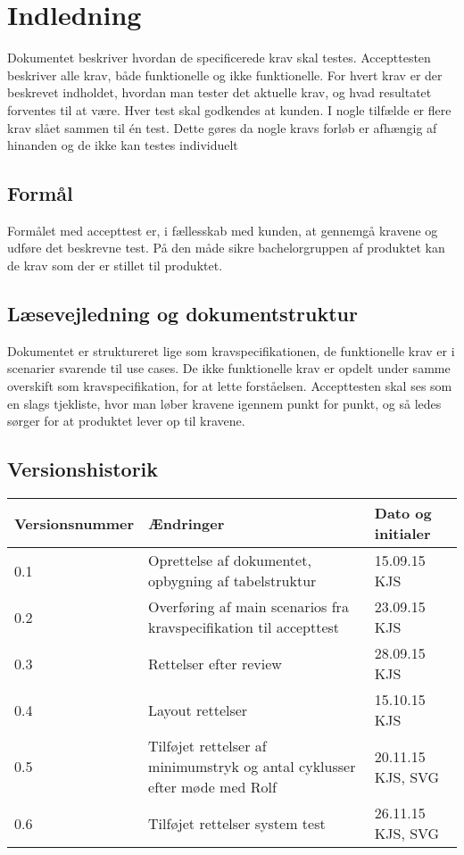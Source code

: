 	\chapter{Indledning}
	Dokumentet beskriver hvordan de specificerede krav skal testes. Accepttesten beskriver alle krav, både funktionelle og ikke funktionelle. For hvert krav er der beskrevet indholdet, hvordan man tester det aktuelle krav, og hvad resultatet forventes til at være. Hver test skal godkendes at kunden. 
	I nogle tilfælde er flere krav slået sammen til én test. Dette gøres da nogle kravs forløb er afhængig af hinanden og de ikke kan testes individuelt 
	
	\section{Formål}
	Formålet med accepttest er, i fællesskab med kunden, at gennemgå kravene og udføre det beskrevne test. På den måde sikre bachelorgruppen af produktet kan de krav som der er stillet til produktet. 
	
	\section{Læsevejledning og dokumentstruktur}
	Dokumentet er struktureret lige som kravspecifikationen, de funktionelle krav er i scenarier svarende til use cases. De ikke funktionelle krav er opdelt under samme overskift som kravspecifikation, for at lette forståelsen. 
	Accepttesten skal ses som en slags tjekliste, hvor man løber kravene igennem punkt for punkt, og så ledes sørger for at produktet lever op til kravene. 
	
	\section{Versionshistorik}
		\begin{longtable}{ |p{} |p{}| p{}|  } 
			\hline
			\rowcolor{usDef}
			\textbf{Versionsnummer} &  \textbf{Ændringer} & \textbf{Dato og initialer} \\
			\hline
			0.1 & Oprettelse af dokumentet, opbygning af tabelstruktur  & 15.09.15 KJS \\
			\hline
			0.2 & Overføring af main scenarios fra kravspecifikation til accepttest  & 23.09.15 KJS \\
			\hline
			0.3 & Rettelser efter review & 28.09.15 KJS \\
			\hline
			0.4 & Layout rettelser & 15.10.15 KJS \\
			\hline
			0.5 & Tilføjet rettelser af minimumstryk og antal cyklusser efter møde med Rolf & 20.11.15 KJS, SVG \\
			\hline
			0.6 & Tilføjet rettelser system test & 26.11.15 KJS, SVG \\
			\hline
			
		\end{longtable}
	
